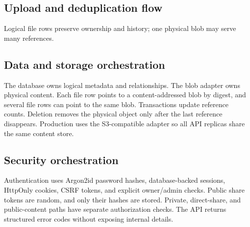 \documentclass[11pt,a4paper]{article}
\begin{document}
\subsection{Upload and deduplication flow}
\begin{center}
\end{center}
\begin{center}\textcolor{muted}{\scriptsize Logical file rows preserve ownership and history; one physical blob may serve many references.}\end{center}

\subsection{Data and storage orchestration}
The database owns logical metadata and relationships. The blob adapter owns physical content. Each file row points to a content-addressed blob by digest, and several file rows can point to the same blob. Transactions update reference counts. Deletion removes the physical object only after the last reference disappears. Production uses the S3-compatible adapter so all API replicas share the same content store.

\subsection{Security orchestration}
Authentication uses Argon2id password hashes, database-backed sessions, HttpOnly cookies, CSRF tokens, and explicit owner/admin checks. Public share tokens are random, and only their hashes are stored. Private, direct-share, and public-content paths have separate authorization checks. The API returns structured error codes without exposing internal details.
\end{document}
